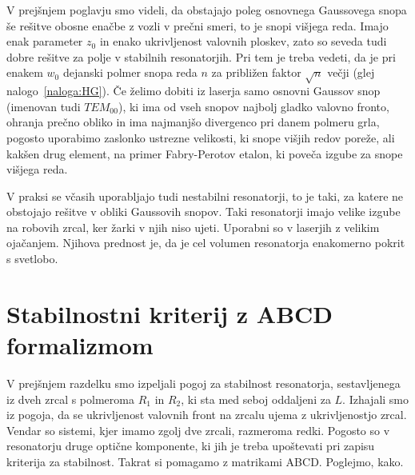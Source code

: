 \noindent
V prejšnjem poglavju smo videli, da obstajajo poleg osnovnega Gaussovega
snopa še rešitve obosne enačbe z vozli v prečni smeri, to je snopi
višjega reda. Imajo enak parameter $z_{0}$ in enako ukrivljenost
valovnih ploskev, zato so seveda tudi dobre rešitve za polje v stabilnih
resonatorjih. Pri tem je treba vedeti, da je pri enakem $w_{0}$
dejanski polmer snopa reda $n$ za približen faktor $\sqrt{n}$ večji 
(glej nalogo~\ref{naloga:HG}). Če želimo dobiti iz laserja samo 
osnovni Gaussov snop (imenovan tudi $TEM_{00}$), ki ima od vseh snopov
najbolj gladko valovno fronto, ohranja prečno obliko in ima najmanjšo 
divergenco pri danem polmeru grla, pogosto uporabimo zaslonko
ustrezne velikosti, ki snope višjih redov poreže, ali kakšen drug
element, na primer Fabry-Perotov etalon, ki poveča izgube za snope višjega reda.
 
\begin{remark}
V praksi se včasih uporabljajo tudi nestabilni resonatorji, to je
taki, za katere ne obstojajo rešitve v obliki Gaussovih snopov. Taki
resonatorji imajo velike izgube na robovih zrcal, ker žarki v njih niso ujeti. 
Uporabni so v laserjih z velikim ojačanjem. Njihova prednost je, da je cel
volumen resonatorja enakomerno pokrit s svetlobo.
\end{remark}

\section{Stabilnostni kriterij z ABCD formalizmom}
V prejšnjem razdelku smo izpeljali pogoj za stabilnost resonatorja, 
sestavljenega iz dveh zrcal s polmeroma $R_1$ in $R_2$, ki sta med 
seboj oddaljeni za $L$. Izhajali smo iz pogoja, da se ukrivljenost
valovnih front na zrcalu ujema z ukrivljenostjo zrcal. Vendar so sistemi,
kjer imamo zgolj dve zrcali, razmeroma redki. Pogosto so v resonatorju
druge optične komponente, ki jih je treba upoštevati pri zapisu
kriterija za stabilnost. Takrat si pomagamo z matrikami ABCD. Poglejmo, kako.\\

